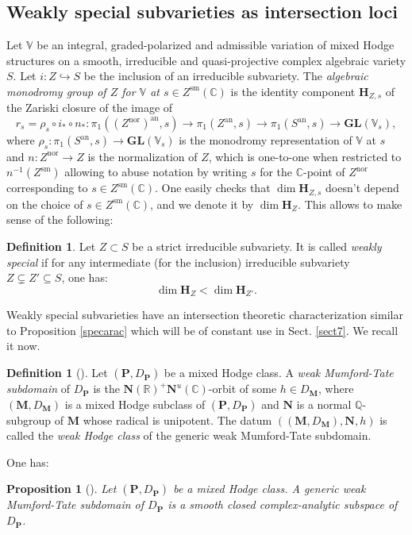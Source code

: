 \documentclass[10pt]{article}
\numberwithin{equation}{subsection}
\theoremstyle{plain}
\newtheorem{proposition}[theorem]{Proposition}
\theoremstyle{definition}
\newtheorem{definition}[theorem]{Definition}
\theoremstyle{remark}
\newcommand{\Q}{\mathbb Q}
\newcommand{\C}{\mathbb C}
\newcommand{\R}{\mathbb R}
\newcommand{\V}{\mathbb V}
\newcommand{\sm}{\mathrm{sm}}
\newcommand{\pp}{\mathbf P}
\newcommand{\mon}{\mathbf H}
\newcommand{\M}{\mathbf M}
\newcommand{\NN}{\mathbf N}
\newcommand{\an}{\mathrm{an}}
\newcommand{\gl}{\mathbf{GL}}
\begin{document}
\subsection{Weakly special subvarieties as intersection loci}
Let $\V$ be an integral, graded-polarized and admissible variation of mixed Hodge structures on a smooth, irreducible and quasi-projective complex algebraic variety $S$. Let $i : Z \hookrightarrow S$ be the inclusion of an irreducible subvariety. The \textit{algebraic monodromy group of $Z$ for $\V$ at $s \in Z^\sm(\C)$} is the identity component $\mon_{Z,s}$ of the Zariski closure of the image of 
\[
r_{s} = \rho_s \circ i_\ast \circ n_\ast  : \pi_1((Z^\mathrm{nor})^\an, s) \rightarrow \pi_1(Z^\an,s) \rightarrow \pi_1(S^\an,s) \rightarrow \gl(\V_s),
\]
where $\rho_s : \pi_1(S^\an,s) \rightarrow \gl(\V_s)$ is the monodromy representation of $\V$ at $s$ and $n : Z^\mathrm{nor} \rightarrow Z$ is the normalization of $Z$, which is one-to-one when restricted to $n^{-1}(Z^\sm)$ allowing to abuse notation by writing $s$ for the $\C$-point of $Z^\mathrm{nor}$ corresponding to $s \in Z^\sm(\C)$. One easily checks that $\dim \mon_{Z,s}$ doesn't depend on the choice of $s \in Z^\sm(\C)$, and we denote it by $\dim \mon_Z$. This allows to make sense of the following:
\begin{definition}
Let $Z \subset S$ be a strict irreducible subvariety. It is called \textit{weakly special} if for any intermediate (for the inclusion) irreducible subvariety $Z \subsetneq Z' \subseteq S$, one has:
\[
\dim \mon_{Z} < \dim \mon_{Z'}.
\]
\end{definition}
Weakly special subvarieties have an intersection theoretic characterization similar to Proposition \ref{specarac} which will be of constant use in Sect. \ref{sect7}. We recall it now.
\begin{definition}[{\cite[Def. 2.5]{klingao}}]
Let $(\pp, D_\pp)$ be a mixed Hodge class. A \textit{weak Mumford-Tate subdomain} of $D_\pp$ is the $\NN(\R)^+\NN^u(\C)$-orbit of some $h \in D_\M$, where $(\M, D_\M)$ is a mixed Hodge subclass of $(\pp, D_\pp)$ and  $\NN$ is a normal $\Q$-subgroup of $\M$ whose radical is unipotent. The datum $((\M, D_\M),\NN,h)$ is called the \textit{weak Hodge class} of the generic weak Mumford-Tate subdomain.
\end{definition}
One has:
\begin{proposition}[{\cite[Prop. 2.6]{klingao}}]
Let $(\pp,D_\pp)$ be a mixed Hodge class. A generic weak Mumford-Tate subdomain of $D_\pp$ is a smooth closed complex-analytic subspace of $D_\pp$.
\end{proposition}
\end{document}
